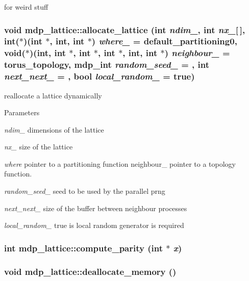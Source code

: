 for weird stuff \hypertarget{classmdp__lattice_a04f3271fe78a6f61f10c4151145f6db5}{
\subsubsection[{allocate\_\-lattice}]{\setlength{\rightskip}{0pt plus 5cm}void mdp\_\-lattice::allocate\_\-lattice (int {\em ndim\_\-}, \/  int {\em nx\_\-}\mbox{[}$\,$\mbox{]}, \/  int($\ast$)(int $\ast$, int, int $\ast$) {\em where\_\-} = {\ttfamily default\_\-partitioning0}, \/  void($\ast$)(int, int $\ast$, int $\ast$, int $\ast$, int, int $\ast$) {\em neighbour\_\-} = {\ttfamily torus\_\-topology}, \/  {\bf mdp\_\-int} {\em random\_\-seed\_\-} = {}, \/  int {\em next\_\-next\_\-} = {}, \/  bool {\em local\_\-random\_\-} = {\ttfamily true})}}
\label{classmdp__lattice_a04f3271fe78a6f61f10c4151145f6db5}
reallocate a lattice dynamically 
\begin{DoxyParams}{Parameters}
\item[{\em ndim\_\-}]dimensions of the lattice \item[{\em nx\_\-}]size of the lattice \item[{\em where}]pointer to a partitioning function  neighbour\_\- pointer to a topology function. \item[{\em random\_\-seed\_\-}]seed to be used by the parallel prng \item[{\em next\_\-next\_\-}]size of the buffer between neighbour processes \item[{\em local\_\-random\_\-}]true is local random generator is required \end{DoxyParams}
\hypertarget{classmdp__lattice_a3c949964a192c244a6f39df0aaceb1d2}{
\subsubsection[{compute\_\-parity}]{\setlength{\rightskip}{0pt plus 5cm}int mdp\_\-lattice::compute\_\-parity (int $\ast$ {\em x})}}
\label{classmdp__lattice_a3c949964a192c244a6f39df0aaceb1d2}
\hypertarget{classmdp__lattice_af5407cf7f7d5eded3870abf0515e110d}{
\subsubsection[{deallocate\_\-memory}]{\setlength{\rightskip}{0pt plus 5cm}void mdp\_\-lattice::deallocate\_\-memory ()}}
\label{classmdp__lattice_af5407cf7f7d5eded3870abf0515e110d}


